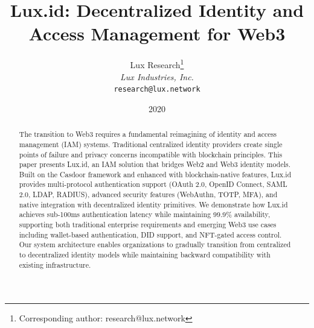 \documentclass[11pt,a4paper]{article}
\title{Lux.id: Decentralized Identity and Access Management for Web3}
\author{
Lux Research\thanks{Corresponding author: research@lux.network}\\
\textit{Lux Industries, Inc.}\\
\texttt{research@lux.network}
}
\date{2020}
\begin{document}
\luxcoverpage

\begin{abstract}
The transition to Web3 requires a fundamental reimagining of identity and access management (IAM) systems. Traditional centralized identity providers create single points of failure and privacy concerns incompatible with blockchain principles. This paper presents Lux.id, an IAM solution that bridges Web2 and Web3 identity models. Built on the Casdoor framework and enhanced with blockchain-native features, Lux.id provides multi-protocol authentication support (OAuth 2.0, OpenID Connect, SAML 2.0, LDAP, RADIUS), advanced security features (WebAuthn, TOTP, MFA), and native integration with decentralized identity primitives. We demonstrate how Lux.id achieves sub-100ms authentication latency while maintaining 99.9\% availability, supporting both traditional enterprise requirements and emerging Web3 use cases including wallet-based authentication, DID support, and NFT-gated access control. Our system architecture enables organizations to gradually transition from centralized to decentralized identity models while maintaining backward compatibility with existing infrastructure.
\end{abstract}














\end{document}
